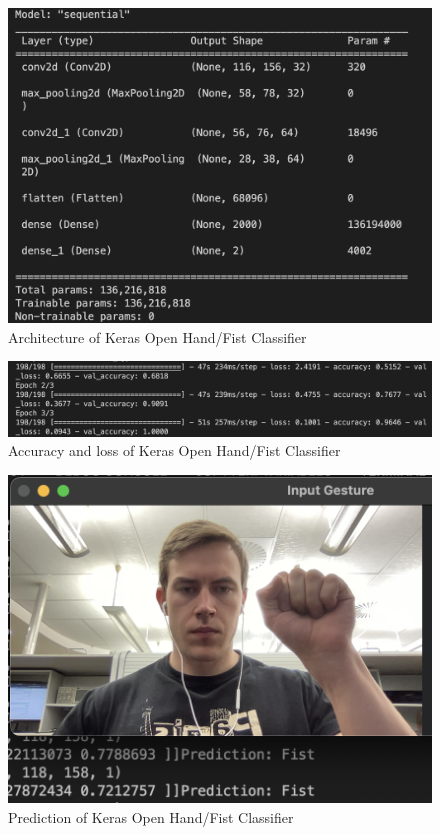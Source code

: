 \begin{figure}[h]
    \centering
    \includegraphics[width=0.6\linewidth]{figures/tensorflow_open_hand_fist_arch.png}
    \caption{Architecture of Keras Open Hand/Fist Classifier}
    \label{fig:tensorflow_open_hand_fist_arch}
\end{figure}

\begin{figure}[h]
    \centering
    \includegraphics[width=0.7\linewidth]{figures/tensorflow_open_hand_fist_accuracy.png}
    \caption{Accuracy and loss of Keras Open Hand/Fist Classifier}
    \label{fig:tensorflow_open_hand_fist_accuracy}
\end{figure}

\begin{figure}[h]
    \centering
    \includegraphics[width=0.6\linewidth]{figures/tensorflow_open_hand_fist_prediction1.png}
    \caption{Prediction of Keras Open Hand/Fist Classifier}
    \label{fig:tensorflow_open_hand_fist_prediction1}
\end{figure}

